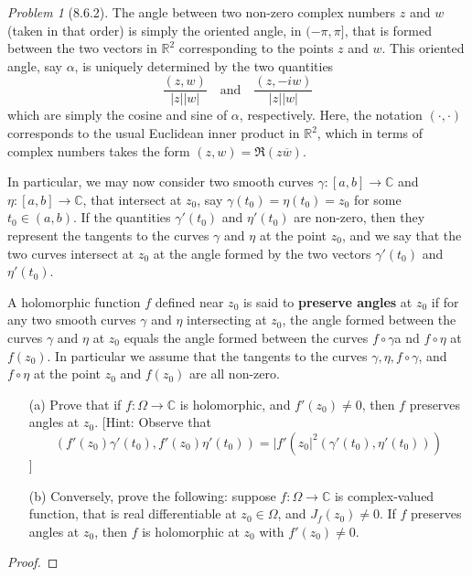 \documentclass[10pt]{article}
\newcommand{\sk}{\vskip 6mm}
\newcommand{\bb}[1]{\mathbb{#1}}
\newcommand{\conj}[1]{\overline{#1}}
\theoremstyle{remark}
\newtheorem{problem}{Problem}
\theoremstyle{remark}
\begin{document}
\begin{problem}[8.6.2]
  The angle between two non-zero complex numbers $z$ and $w$ (taken in that order) is simply the oriented angle, in $(-\pi,\pi]$, that is formed between the two vectors in $\bb{R}^2$ corresponding to the points $z$ and $w$. This oriented angle, say $\alpha$, is uniquely determined by the two quantities
  \[
    \frac{(z,w)}{|z||w|}\quad\text{and}\quad \frac{(z,-iw)}{|z||w|}
  \]
  which are simply the cosine and sine of $\alpha$, respectively. Here, the notation $(\cdot,\cdot)$ corresponds to the usual Euclidean inner product in $\bb{R}^2$, which in terms of complex numbers takes the form $(z,w)=\Re(z\conj{w})$.

  In particular, we may now consider two smooth curves $\gamma:[a,b]\rightarrow\bb{C}$ and $\eta:[a,b]\rightarrow\bb{C}$, that intersect at $z_0$, say $\gamma(t_0)=\eta(t_0)=z_0$ for some $t_0\in(a,b)$. If the quantities $\gamma'(t_0)$ and $\eta'(t_0)$ are non-zero, then they represent the tangents to the curves $\gamma$ and $\eta$ at the point $z_0$, and we say that the two curves intersect at $z_0$ at the angle formed by the two vectors $\gamma'(t_0)$ and $\eta'(t_0)$.

  A holomorphic function $f$ defined near $z_0$ is said to \textbf{preserve angles} at $z_0$ if for any two smooth curves $\gamma$ and $\eta$ intersecting at $z_0$, the angle formed between the curves $\gamma$ and $\eta$ at $z_0$ equals the angle formed between the curves $f\circ\gamma$a nd $f\circ\eta$ at $f(z_0)$. In particular we assume that the tangents to the curves $\gamma,\eta,f\circ\gamma$, and $f\circ\eta$ at the point $z_0$ and $f(z_0)$ are all non-zero.
  \begin{enumerate}
  \item[(a)] Prove that if $f:\Omega\rightarrow\bb{C}$ is holomorphic, and $f'(z_0)\neq 0$, then $f$ preserves angles at $z_0$. [Hint: Observe that
    \[
      (f'(z_0)\gamma'(t_0),f'(z_0)\eta'(t_0))=|f'(z_0|^2(\gamma'(t_0),\eta'(t_0)))
    \]
      ]
  \item[(b)] Conversely, prove the following: suppose $f:\Omega\rightarrow\bb{C}$ is complex-valued function, that is real differentiable at $z_0\in\Omega$, and $J_f(z_0)\neq 0$. If $f$ preserves angles at $z_0$, then $f$ is holomorphic at $z_0$ with $f'(z_0)\neq 0$.
  \end{enumerate}
\end{problem}

\begin{proof}
  
\end{proof}

\sk

\end{document}
